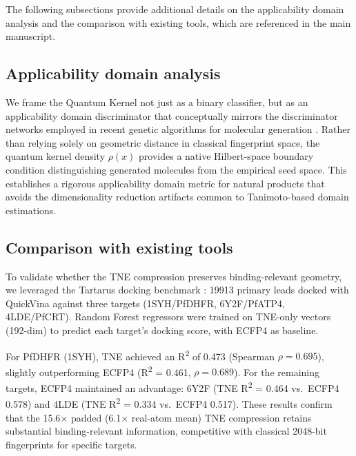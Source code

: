 \documentclass[11pt,a4paper]{article}
\begin{document}
The following subsections provide additional details on the applicability domain analysis and the comparison with existing tools, which are referenced in the main manuscript.

\subsection{Applicability domain analysis}
\label{SM-sec:applicability_domain}

We frame the Quantum Kernel not just as a binary classifier, but as an applicability domain discriminator that conceptually mirrors the discriminator networks employed in recent genetic algorithms for molecular generation \citep{jensen2019augmenting}. Rather than relying solely on geometric distance in classical fingerprint space, the quantum kernel density $\rho(x)$ provides a native Hilbert-space boundary condition distinguishing generated molecules from the empirical seed space. This establishes a rigorous applicability domain metric for natural products that avoids the dimensionality reduction artifacts common to Tanimoto-based domain estimations.


\subsection{Comparison with existing tools}


To validate whether the TNE compression preserves binding-relevant geometry, we leveraged the Tartarus docking benchmark \citep{tartarus_2024}: \num{19913} primary leads docked with QuickVina against three targets (1SYH/PfDHFR, 6Y2F/PfATP4, 4LDE/PfCRT). Random Forest regressors were trained on TNE-only vectors (\num{192}-dim) to predict each target's docking score, with ECFP4 as baseline.

For PfDHFR (1SYH), TNE achieved an R\textsuperscript{2} of \num{0.473} (Spearman $\rho = \num{0.695}$), slightly outperforming ECFP4 (R\textsuperscript{2} = \num{0.461}, $\rho = \num{0.689}$). For the remaining targets, ECFP4 maintained an advantage: 6Y2F (TNE R\textsuperscript{2} = \num{0.464} vs.\ ECFP4 \num{0.578}) and 4LDE (TNE R\textsuperscript{2} = \num{0.334} vs.\ ECFP4 \num{0.517}). These results confirm that the \num{15.6}$\times$ padded (\num{6.1}$\times$ real-atom mean) TNE compression retains substantial binding-relevant information, competitive with classical \num{2048}-bit fingerprints for specific targets.
\end{document}
